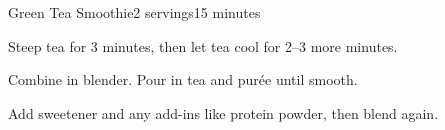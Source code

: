 \documentclass[../Cookbook.tex]{subfiles}
\begin{document}
\begin{recipe}{Green Tea Smoothie}{2 servings}{15 minutes}

Steep tea for 3 minutes, then let tea cool for 2--3 more minutes.

Combine in blender. Pour in tea and pur\'ee until smooth.

Add sweetener and any add-ins like protein powder, then blend again.

\end{recipe}
\end{document}
